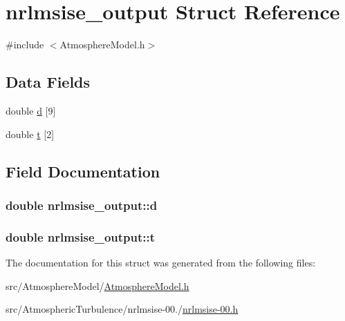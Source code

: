 \hypertarget{structnrlmsise__output}{\section{nrlmsise\+\_\+output Struct Reference}
\label{structnrlmsise__output}
}


{\ttfamily \#include $<$Atmosphere\+Model.\+h$>$}

\subsection*{Data Fields}
\begin{DoxyCompactItemize}
\item 
double \hyperlink{structnrlmsise__output_ad51f28ff53a54f67169758917830744f}{d} \mbox{[}9\mbox{]}
\item 
double \hyperlink{structnrlmsise__output_a1e33d6a915ec665948e39765ee305709}{t} \mbox{[}2\mbox{]}
\end{DoxyCompactItemize}


\subsection{Field Documentation}
\hypertarget{structnrlmsise__output_ad51f28ff53a54f67169758917830744f}{
\subsubsection[{d}]{\setlength{\rightskip}{0pt plus 5cm}double nrlmsise\+\_\+output\+::d}}\label{structnrlmsise__output_ad51f28ff53a54f67169758917830744f}
\hypertarget{structnrlmsise__output_a1e33d6a915ec665948e39765ee305709}{
\subsubsection[{t}]{\setlength{\rightskip}{0pt plus 5cm}double nrlmsise\+\_\+output\+::t}}\label{structnrlmsise__output_a1e33d6a915ec665948e39765ee305709}


The documentation for this struct was generated from the following files\+:\begin{DoxyCompactItemize}
\item 
src/\+Atmosphere\+Model/\hyperlink{AtmosphereModel_8h}{Atmosphere\+Model.\+h}\item 
src/\+Atmospheric\+Turbulence/nrlmsise-\/00./\hyperlink{nrlmsise-00_8h}{nrlmsise-\/00.\+h}\end{DoxyCompactItemize}
